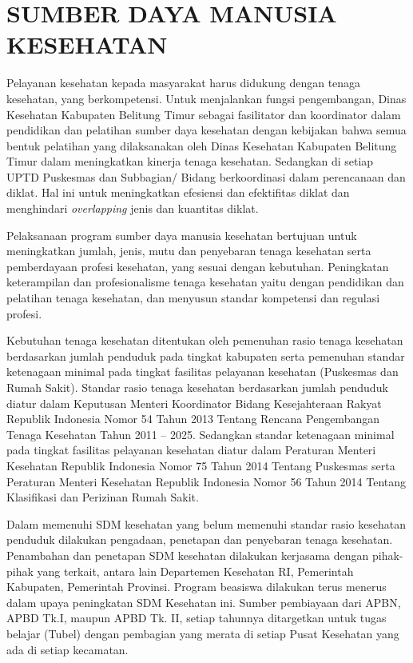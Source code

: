 \chapter{SUMBER DAYA MANUSIA KESEHATAN}

Pelayanan kesehatan kepada masyarakat harus didukung dengan tenaga kesehatan, yang berkompetensi. Untuk menjalankan fungsi pengembangan, Dinas Kesehatan Kabupaten Belitung Timur sebagai fasilitator dan koordinator dalam pendidikan dan pelatihan sumber daya kesehatan dengan kebijakan bahwa semua bentuk pelatihan yang dilaksanakan oleh Dinas Kesehatan Kabupaten Belitung Timur dalam meningkatkan kinerja tenaga kesehatan. Sedangkan di setiap UPTD Puskesmas dan Subbagian/ Bidang berkoordinasi dalam perencanaan dan diklat. Hal ini untuk meningkatkan efesiensi dan efektifitas diklat dan menghindari \textit{overlapping} jenis dan kuantitas diklat.

Pelaksanaan program sumber daya manusia kesehatan bertujuan untuk meningkatkan jumlah, jenis, mutu dan penyebaran tenaga kesehatan serta pemberdayaan profesi kesehatan, yang sesuai dengan kebutuhan. Peningkatan keterampilan dan profesionalisme tenaga kesehatan yaitu dengan pendidikan dan pelatihan tenaga kesehatan, dan menyusun standar kompetensi dan regulasi profesi.

Kebutuhan tenaga kesehatan ditentukan oleh pemenuhan rasio tenaga kesehatan berdasarkan jumlah penduduk pada tingkat kabupaten serta pemenuhan standar ketenagaan minimal pada tingkat fasilitas pelayanan kesehatan (Puskesmas dan Rumah Sakit). Standar rasio tenaga kesehatan berdasarkan jumlah penduduk diatur dalam Keputusan Menteri Koordinator Bidang Kesejahteraan Rakyat Republik Indonesia Nomor 54 Tahun 2013 Tentang Rencana Pengembangan Tenaga Kesehatan Tahun 2011 – 2025. Sedangkan standar ketenagaan minimal pada tingkat fasilitas pelayanan kesehatan
diatur dalam Peraturan Menteri Kesehatan Republik Indonesia Nomor 75 Tahun 2014 Tentang Puskesmas serta Peraturan Menteri Kesehatan Republik Indonesia Nomor 56 Tahun 2014 Tentang Klasifikasi dan Perizinan Rumah Sakit.

Dalam memenuhi SDM kesehatan yang belum memenuhi standar rasio kesehatan penduduk dilakukan pengadaan, penetapan dan penyebaran tenaga kesehatan. Penambahan dan penetapan SDM kesehatan dilakukan kerjasama dengan pihak-pihak yang terkait, antara lain Departemen Kesehatan RI, Pemerintah Kabupaten, Pemerintah Provinsi. Program beasiswa dilakukan terus menerus dalam upaya peningkatan SDM Kesehatan ini. Sumber pembiayaan dari APBN, APBD Tk.I, maupun APBD Tk. II, setiap tahunnya ditargetkan untuk tugas belajar (Tubel) dengan pembagian yang merata di setiap Pusat Kesehatan yang ada di setiap kecamatan.

